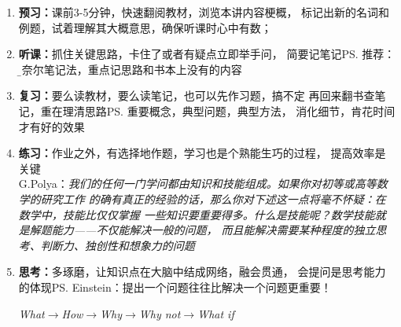 \begin{itemize}
	\begin{enumerate}
	  \item {\bf 预习：}课前3-5分钟，快速翻阅教材，浏览本讲内容梗概，
	  标记出新的名词和例题，试着理解其大概意思，确保听课时心中有数；
	  \item {\bf 听课：}抓住关键思路，卡住了或者有疑点立即举手问，
	  简要记笔记\ps{推荐：\b 康奈尔笔记法}，重点记思路和书本上没有的内容
	  \item {\bf 复习：}要么读教材，要么读笔记，也可以先作习题，搞不定
	  再回来翻书查笔记，重在理清思路\ps{重要概念，典型问题，典型方法}，
	  消化细节，肯花时间才有好的效果
	  \item {\bf 练习：}作业之外，有选择地作题，学习也是个熟能生巧的过程，
	  提高效率是关键\\
	  G.Polya：{\it 我们的任何一门学问都由知识和技能组成。如果你对初等或高等数学的研究工作
	  的确有真正的经验的话，那么你对下述这一点将毫不怀疑：在数学中，技能比仅仅掌握
	  一些知识要重要得多。什么是技能呢？数学技能就是解题能力——不仅能解决一般的问题，
	  而且能解决需要某种程度的独立思考、判断力、独创性和想象力的问题}
	  \item {\bf 思考：}多琢磨，让知识点在大脑中结成网络，融会贯通，
	  会提问是思考能力的体现\ps{Einstein：提出一个问题往往比解决一个问题更重要！}
	  \centerline{\it What$\to$How$\to$Why$\to$Why not$\to$What if}
	\end{enumerate}
\end{itemize}

